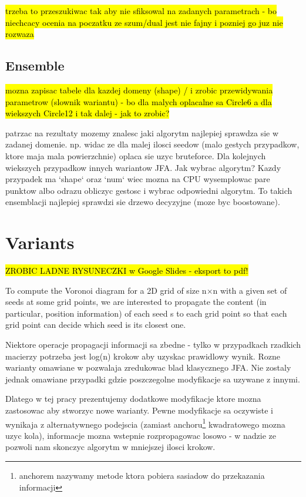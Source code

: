 \documentclass[format=acmsmall,screen,review,authordraft,nonacm]{acmart}
\begin{document}
\hl{trzeba to przeszukiwac tak aby nie sfiksowal na zadanych parametrach - bo
niechcacy ocenia na poczatku ze szum/dual jest nie fajny i pozniej go juz nie
rozwaza}

\subsection{Ensemble} %

\hl{mozna zapisac tabele dla kazdej domeny (shape) / i zrobic przewidywania
parametrow (slownik wariantu) - bo dla malych oplacalne sa Circle6 a dla
wiekszych Circle12 i tak dalej - jak to zrobic?}

patrzac na rezultaty mozemy znalesc jaki algorytm najlepiej sprawdza sie w
zadanej domenie. np. widac ze dla malej ilosci seedow (malo gestych przypadkow,
ktore maja mala powierzchnie) oplaca sie uzyc bruteforce. Dla kolejnych
wiekszych przypadkow innych wariantow JFA. Jak wybrac algorytm? Kazdy przypadek ma `shape` oraz `num` wiec mozna na CPU wysemplowac
pare punktow albo odrazu obliczyc gestosc i wybrac odpowiedni algorytm.
To takich ensemblacji najlepiej sprawdzi sie drzewo decyzyjne (moze byc boostowane).

\section{Variants} %

\hl{ZROBIC LADNE RYSUNECZKI w Google Slides - eksport to pdf!}

To compute the Voronoi diagram for a 2D grid of size n×n
with a given set of seeds at some grid points, we are interested to
propagate the content (in particular, position information) of each
seed s to each grid point so that each grid point can decide which
seed is its closest one.

Niektore operacje propagacji informacji sa zbedne - tylko w przypadkach
rzadkich macierzy potrzeba jest log(n) krokow aby uzyskac prawidlowy wynik.
Rozne warianty omawiane w \cite{rong2007variants} pozwalaja zredukowac blad
klasycznego JFA. Nie zostaly jednak omawiane przypadki gdzie poszczegolne
modyfikacje sa uzywane z innymi.

Dlatego w tej pracy prezentujemy dodatkowe modyfikacje ktore mozna zastosowac
aby stworzyc nowe warianty. Pewne modyfikacje sa oczywiste i wynikaja z
alternatywnego podejscia (zamiast anchoru\footnote{anchorem nazywamy metode
ktora pobiera sasiadow do przekazania informacji} kwadratowego mozna uzyc kola),
informacje mozna wstepnie rozpropagowac losowo - w nadzie ze pozwoli nam
skonczyc algorytm w mniejszej ilosci krokow.
\end{document}

